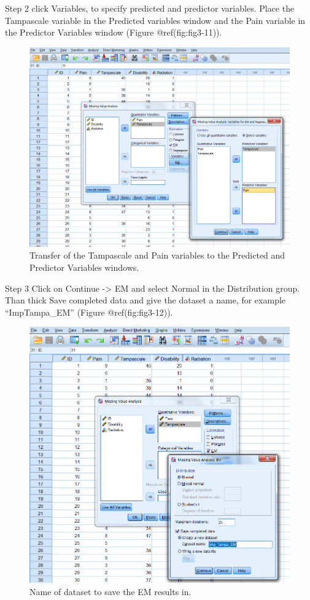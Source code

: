 \documentclass[
]{book}
\begin{document}
Step 2 click Variables, to specify predicted and predictor variables.
Place the Tampascale variable in the Predicted variables window and the
Pain variable in the Predictor Variables window (Figure
@ref(fig:fig3-11)).

\begin{figure}

{\centering \includegraphics[width=0.7\linewidth]{images/fig3.11} 

}

\caption{Transfer of the Tampascale and Pain variables to the Predicted and Predictor Variables windows.}\label{fig:fig3-11}
\end{figure}

Step 3 Click on Continue -\textgreater{} EM and select Normal in the
Distribution group. Than thick Save completed data and give the dataset
a name, for example ``ImpTampa\_EM'' (Figure @ref(fig:fig3-12)).

\begin{figure}

{\centering \includegraphics[width=0.7\linewidth]{images/fig3.12} 

}

\caption{Name of dataset to save the EM results in.}\label{fig:fig3-12}
\end{figure}
\end{document}
